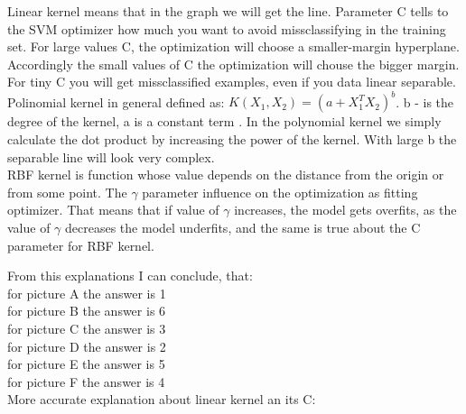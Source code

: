 \documentclass[12pt,a4paper]{article}
\begin{document}
Linear kernel means that in the graph we will get the line. Parameter C tells to the SVM optimizer how much you want to avoid missclassifying in the training set. For large values C, the optimization will choose a smaller-margin hyperplane. Accordingly the small values of C the optimization will chouse the bigger margin. For tiny C you will get missclassified examples, even if you data linear separable.\\
 Polinomial kernel in general defined as: $K(X_1,X_2) = (a+X_1^T X_2)^b$. b - is the degree of the kernel, a is a constant term \cite{svm}. In the polynomial kernel we simply calculate the dot product by increasing the power of the kernel. With large b the separable line will look very complex.\\
RBF kernel is function whose value depends on the distance from the origin or from some point. The $\gamma$ parameter influence on the optimization as fitting optimizer. That means that if value of $\gamma$  increases, the model gets overfits, as the value of $\gamma$  decreases the model underfits, and the same is true about the C parameter for RBF kernel.

From this explanations I can conclude, that:\\
for picture A the answer is 1\\
for picture B the answer is 6\\
for picture C the answer is 3\\
for picture D the answer is 2\\
for picture E the answer is 5\\
for picture F the answer is 4\\

More accurate explanation about linear kernel an its C:\\
\end{document}
